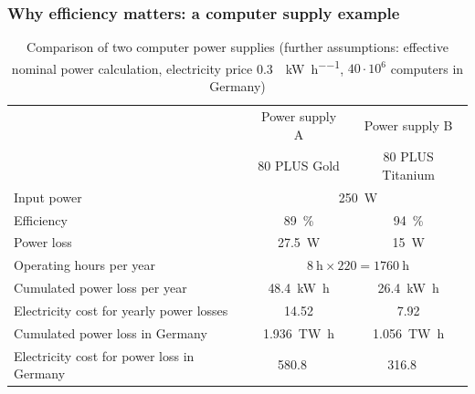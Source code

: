 \begin{frame}[c]
	\frametitle{Why efficiency matters: a computer supply example}
	\begin{table}
		\centering
		\begin{tabular}{lcc}
			\toprule
			& Power supply A & Power supply B \\
			& 80 PLUS Gold & 80 PLUS Titanium \\
			\midrule
			Input power & \multicolumn{2}{c}{\SI{250}{\watt}} \\
			Efficiency & \SI{89}{\percent} & \SI{94}{\percent}  \\
			Power loss & \SI{27.5}{\watt} & \SI{15}{\watt}\\
			\midrule
			Operating hours per year & \multicolumn{2}{c}{$\SI{8}{\hour} \times 220 = \SI{1760}{\hour}$} \\
			Cumulated power loss per year & \SI{48.4}{\kilo\watt\hour} & \SI{26.4}{\kilo\watt\hour} \\
			Electricity cost for yearly power losses & \SI{14.52}{\EUR} & \SI{7.92}{\EUR} \\
			\midrule
			Cumulated power loss in Germany & \SI{1.936}{\tera\watt\hour} & \SI{1.056}{\tera\watt\hour} \\
			Electricity cost for power loss in Germany & \SI{580.8}{\mega\EUR} & \SI{316.8}{\mega\EUR} \\
			\bottomrule
		\end{tabular}
		\label{tab:efficiency_computer_supply_example}
		\caption{Comparison of two computer power supplies (further assumptions: effective nominal power calculation, electricity price \SI[fraction-function=\nicefrac]{0.3}{\EUR\per\kilo\watt\per\hour}, $40\cdot 10^6$ computers in Germany)}
	\end{table}
\end{frame}


